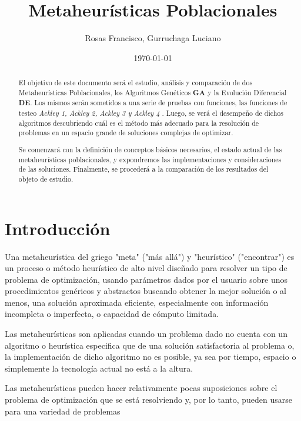 \documentclass[10pt]{article}
\title{Metaheurísticas Poblacionales} %
\author{Rosas Francisco, Gurruchaga Luciano}
\date{\today} %
\begin{document}
\maketitle

\begin{abstract}

El objetivo de este documento será el estudio, análisis y comparación de dos Metaheurísticas Poblacionales, los Algoritmos Genéticos \textbf{GA} y la Evolución Diferencial \textbf{DE}. Los mismos serán sometidos a una serie de pruebas con funciones, las funciones de testeo \textit{Ackley 1, Ackley 2, Ackley 3 y Ackley 4 }. Luego, se verá el desempeño de dichos algoritmos descubriendo cuál es el método más adecuado para la resolución de problemas en un espacio grande de soluciones complejas de optimizar.

Se comenzará con la definición de conceptos básicos necesarios, el estado actual de las metaheurísticas poblacionales, y expondremos las  implementaciones y consideraciones de las soluciones. Finalmente, se procederá a la comparación de los resultados del objeto de estudio.

\end{abstract}


\section{Introducción}

Una metaheurística del griego "meta" ("más allá") y "heurístico" ("encontrar") es un proceso o método heurístico de alto nivel diseñado para resolver un tipo de problema de optimización, usando parámetros dados por el usuario sobre unos procedimientos genéricos y abstractos buscando obtener la mejor solución o al menos, una solución aproximada eficiente, especialmente con información incompleta o imperfecta, o capacidad de cómputo limitada.

Las metaheurísticas son aplicadas cuando un problema dado no cuenta con un algoritmo o heurística especifica que de una solución satisfactoria al problema o, la implementación de dicho algoritmo no es posible, ya sea por tiempo, espacio o simplemente la tecnología actual no está a la altura.

Las metaheurísticas pueden hacer relativamente pocas suposiciones sobre el problema de optimización que se está resolviendo y, por lo tanto, pueden usarse para una variedad de problemas
\end{document}
